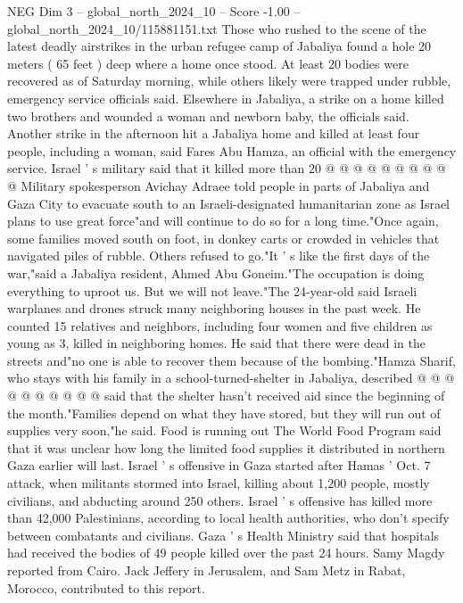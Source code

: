 \begin{textsample}{NEG Dim 3 – global\_north\_2024\_10 – Score -1.00 – global\_north\_2024\_10/115881151.txt}
Those who rushed to the scene of the latest deadly airstrikes in the urban refugee camp of Jabaliya found a hole 20 meters ( 65 feet ) deep where a home once stood.
At least 20 bodies were recovered as of Saturday morning, while others likely were trapped under rubble, emergency service officials said.
Elsewhere in Jabaliya, a strike on a home killed two brothers and wounded a woman and newborn baby, the officials said.
Another strike in the afternoon hit a Jabaliya home and killed at least four people, including a woman, said Fares Abu Hamza, an official with the emergency service.
Israel ' s military said that it killed more than 20 @ @ @ @ @ @ @ @ @ @ Military spokesperson Avichay Adraee told people in parts of Jabaliya and Gaza City to evacuate south to an Israeli-designated humanitarian zone as Israel plans to use great force"and will continue to do so for a long time."Once again, some families moved south on foot, in donkey carts or crowded in vehicles that navigated piles of rubble.
Others refused to go."It ' s like the first days of the war,"said a Jabaliya resident, Ahmed Abu Goneim."The occupation is doing everything to uproot us.
But we will not leave."The 24-year-old said Israeli warplanes and drones struck many neighboring houses in the past week.
He counted 15 relatives and neighbors, including four women and five children as young as 3, killed in neighboring homes.
He said that there were dead in the streets and"no one is able to recover them because of the bombing."Hamza Sharif, who stays with his family in a school-turned-shelter in Jabaliya, described @ @ @ @ @ @ @ @ @ @ said that the shelter hasn't received aid since the beginning of the month."Families depend on what they have stored, but they will run out of supplies very soon,"he said.
Food is running out The World Food Program said that it was unclear how long the limited food supplies it distributed in northern Gaza earlier will last.
Israel ' s offensive in Gaza started after Hamas ' Oct. 7 attack, when militants stormed into Israel, killing about 1,200 people, mostly civilians, and abducting around 250 others.
Israel ' s offensive has killed more than 42,000 Palestinians, according to local health authorities, who don't specify between combatants and civilians.
Gaza ' s Health Ministry said that hospitals had received the bodies of 49 people killed over the past 24 hours.
Samy Magdy reported from Cairo.
Jack Jeffery in Jerusalem, and Sam Metz in Rabat, Morocco, contributed to this report.

\end{textsample}
